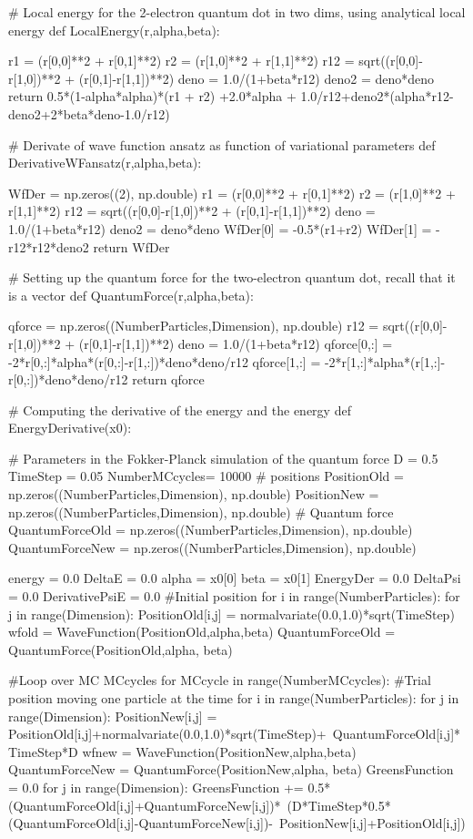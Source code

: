 \documentclass[%
oneside,                 %
final,                   %
10pt]{article}
\begin{document}
# Local energy  for the 2-electron quantum dot in two dims, using analytical local energy
def LocalEnergy(r,alpha,beta):
    
    r1 = (r[0,0]**2 + r[0,1]**2)
    r2 = (r[1,0]**2 + r[1,1]**2)
    r12 = sqrt((r[0,0]-r[1,0])**2 + (r[0,1]-r[1,1])**2)
    deno = 1.0/(1+beta*r12)
    deno2 = deno*deno
    return 0.5*(1-alpha*alpha)*(r1 + r2) +2.0*alpha + 1.0/r12+deno2*(alpha*r12-deno2+2*beta*deno-1.0/r12)

# Derivate of wave function ansatz as function of variational parameters
def DerivativeWFansatz(r,alpha,beta):
    
    WfDer  = np.zeros((2), np.double)
    r1 = (r[0,0]**2 + r[0,1]**2)
    r2 = (r[1,0]**2 + r[1,1]**2)
    r12 = sqrt((r[0,0]-r[1,0])**2 + (r[0,1]-r[1,1])**2)
    deno = 1.0/(1+beta*r12)
    deno2 = deno*deno
    WfDer[0] = -0.5*(r1+r2)
    WfDer[1] = -r12*r12*deno2
    return  WfDer

# Setting up the quantum force for the two-electron quantum dot, recall that it is a vector
def QuantumForce(r,alpha,beta):

    qforce = np.zeros((NumberParticles,Dimension), np.double)
    r12 = sqrt((r[0,0]-r[1,0])**2 + (r[0,1]-r[1,1])**2)
    deno = 1.0/(1+beta*r12)
    qforce[0,:] = -2*r[0,:]*alpha*(r[0,:]-r[1,:])*deno*deno/r12
    qforce[1,:] = -2*r[1,:]*alpha*(r[1,:]-r[0,:])*deno*deno/r12
    return qforce
    

# Computing the derivative of the energy and the energy 
def EnergyDerivative(x0):

    
    # Parameters in the Fokker-Planck simulation of the quantum force
    D = 0.5
    TimeStep = 0.05
    NumberMCcycles= 10000
    # positions
    PositionOld = np.zeros((NumberParticles,Dimension), np.double)
    PositionNew = np.zeros((NumberParticles,Dimension), np.double)
    # Quantum force
    QuantumForceOld = np.zeros((NumberParticles,Dimension), np.double)
    QuantumForceNew = np.zeros((NumberParticles,Dimension), np.double)

    energy = 0.0
    DeltaE = 0.0
    alpha = x0[0]
    beta = x0[1]
    EnergyDer = 0.0
    DeltaPsi = 0.0
    DerivativePsiE = 0.0 
    #Initial position
    for i in range(NumberParticles):
        for j in range(Dimension):
            PositionOld[i,j] = normalvariate(0.0,1.0)*sqrt(TimeStep)
    wfold = WaveFunction(PositionOld,alpha,beta)
    QuantumForceOld = QuantumForce(PositionOld,alpha, beta)

    #Loop over MC MCcycles
    for MCcycle in range(NumberMCcycles):
        #Trial position moving one particle at the time
        for i in range(NumberParticles):
            for j in range(Dimension):
                PositionNew[i,j] = PositionOld[i,j]+normalvariate(0.0,1.0)*sqrt(TimeStep)+\
                                       QuantumForceOld[i,j]*TimeStep*D
            wfnew = WaveFunction(PositionNew,alpha,beta)
            QuantumForceNew = QuantumForce(PositionNew,alpha, beta)
            GreensFunction = 0.0
            for j in range(Dimension):
                GreensFunction += 0.5*(QuantumForceOld[i,j]+QuantumForceNew[i,j])*\
	                              (D*TimeStep*0.5*(QuantumForceOld[i,j]-QuantumForceNew[i,j])-\
                                      PositionNew[i,j]+PositionOld[i,j])
      
\end{document}
